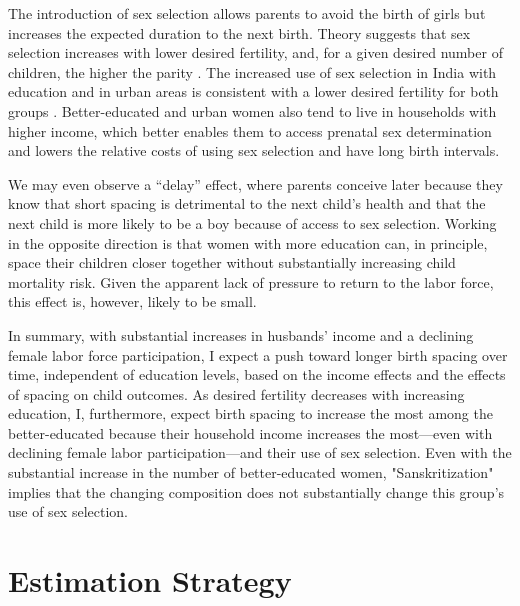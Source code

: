 \documentclass[12pt,letterpaper]{article}
\begin{document}
The introduction of sex selection allows parents to avoid the birth of girls
but increases the expected duration to the next birth.
Theory suggests that sex selection increases with lower desired fertility, and, for a 
given desired number of children, the higher the parity \citep{Portner2015b}.
The increased use of sex selection in India with education and in urban
areas is consistent with a lower desired fertility for both groups
\citep{das_gupta97,retherford03b,Guilmoto2009a,Portner2015b,Jayachandran2017}.
Better-educated and urban women also tend to live in households with higher income, which 
better enables them to access prenatal sex determination and lowers the relative costs of 
using sex selection and have long birth intervals.

We may even observe a ``delay'' effect, where parents conceive later because they know 
that short spacing is detrimental to the next child's health and that the next child is 
more likely to be a boy because of access to sex selection.
Working in the opposite direction is that women with more education can, in principle, 
space their children closer together without substantially increasing child mortality 
risk.
Given the apparent lack of pressure to return to the labor force,
this effect is, however, likely to be small.

In summary, with substantial increases in husbands' income and a declining female labor 
force participation, I expect a push toward longer birth spacing over time, independent
of education levels, based on the income effects and the effects of spacing
on child outcomes.
As desired fertility decreases with increasing education, I, furthermore, expect 
birth spacing to increase the most among the better-educated because their household
income increases the most---even with declining female labor participation---and 
their use of sex selection.
Even with the substantial increase in the number of better-educated women, 
"Sanskritization" implies that the changing composition does not substantially change 
this group's use of sex selection.




\section{Estimation Strategy\label{sec:strategy}}

\end{document}
